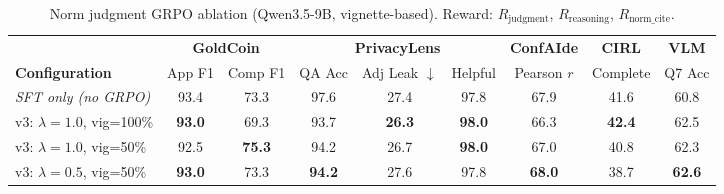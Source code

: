 \begin{table}[ht]
\centering
\caption{Norm judgment GRPO ablation (Qwen3.5-9B, vignette-based). Reward: $R_{\text{judgment}}$, $R_{\text{reasoning}}$, $R_{\text{norm\_cite}}$.}
\label{tab:grpo-v3}
\begin{tabular}{lcccccccc}
\toprule
 & \multicolumn{2}{c}{\textbf{GoldCoin}} & \multicolumn{3}{c}{\textbf{PrivacyLens}} & \multicolumn{1}{c}{\textbf{ConfAIde}} & \multicolumn{1}{c}{\textbf{CIRL}} & \multicolumn{1}{c}{\textbf{VLM}} \\
\cmidrule(lr){2-3} \cmidrule(lr){4-6} \cmidrule(lr){7-7} \cmidrule(lr){8-8} \cmidrule(lr){9-9}
\textbf{Configuration} & App F1 & Comp F1 & QA Acc & Adj Leak $\downarrow$ & Helpful & Pearson $r$ & Complete & Q7 Acc \\
\midrule
\textit{SFT only (no GRPO)} & 93.4 & 73.3 & 97.6 & 27.4 & 97.8 & 67.9 & 41.6 & 60.8 \\
\midrule
v3: $\lambda=1.0$, vig=100\% & \textbf{93.0} & 69.3 & 93.7 & \textbf{26.3} & \textbf{98.0} & 66.3 & \textbf{42.4} & 62.5 \\
v3: $\lambda=1.0$, vig=50\% & 92.5 & \textbf{75.3} & 94.2 & 26.7 & \textbf{98.0} & 67.0 & 40.8 & 62.3 \\
v3: $\lambda=0.5$, vig=50\% & \textbf{93.0} & 73.3 & \textbf{94.2} & 27.6 & 97.8 & \textbf{68.0} & 38.7 & \textbf{62.6} \\
\bottomrule
\end{tabular}
\end{table}